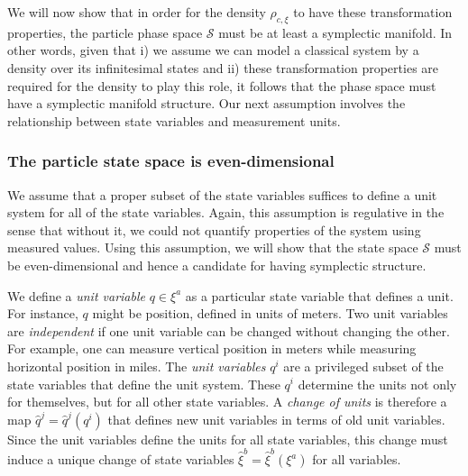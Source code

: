 \documentclass[12pt, twoside]{article}
\begin{document}
We will now show that in order for the density $\rho_{c, \xi}$ to have these transformation properties, the particle phase space $\mathcal{S}$ must be at least a symplectic manifold. In other words, given that i) we assume we can model a classical system by a density over its infinitesimal states and ii) these transformation properties are required for the density to play this role, it follows that the phase space must have a symplectic manifold structure. Our next assumption involves the relationship between state variables and measurement units. 

\subsubsection{The particle state space is even-dimensional}

We assume that a proper subset of the state variables suffices to define a unit system for all of the state variables. Again, this assumption is regulative in the sense that without it, we could not quantify properties of the system using measured values. Using this assumption, we will show that the state space $\mathcal{S}$ must be even-dimensional and hence a candidate for having symplectic structure. 

We define a \textit{unit variable} $q \in \xi^a$ as a particular state variable that defines a unit. For instance, $q$ might be position, defined in units of meters. Two unit variables are \textit{independent} if one unit variable can be changed without changing the other. For example, one can measure vertical position in meters while measuring horizontal position in miles.  The \textit{unit variables} $q^i$ are a privileged subset of the state variables that define the unit system. These $q^i$ determine the units not only for themselves, but for all other state variables. A \textit{change of units} is therefore a map $\hat{q}^j = \hat{q}^j(q^i)$ that defines new unit variables in terms of old unit variables. Since the unit variables define the units for all state variables, this change must induce a unique change of state variables $\hat{\xi}^b = \hat{\xi}^b(\xi^a)$ for all variables.
\end{document}
